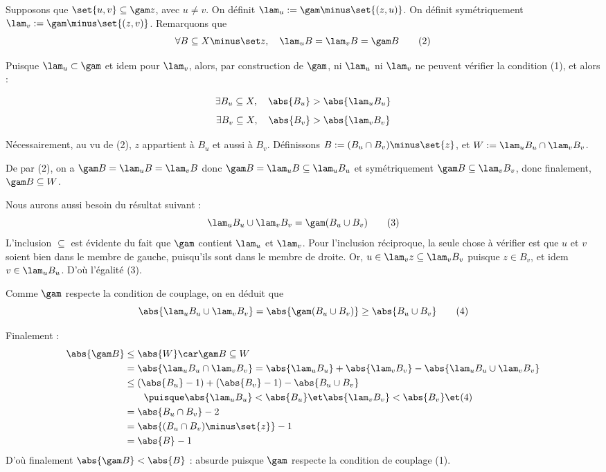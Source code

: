     Supposons que $\set{u,v} \subseteq \gam z$, avec $u \neq v$. On définit $\lam_u := \gam \minus \set{(z,u)}$. On définit symétriquement $\lam_v := \gam \minus \set{(z,v)}$. Remarquons que
    \[ \forall B \subseteq X \minus \set z, \quad \lam_u B = \lam_v B = \gam B \tag{2} \]
    
    Puisque $\lam_u \subset \gam$ et idem pour $\lam_v$, alors, par construction de $\gam$, ni $\lam_u$ ni $\lam_v$ ne peuvent vérifier la condition (1), et alors :
    
    \[ \exists B_u \subseteq X, \quad \abs{B_u} > \abs{\lam_u B_u} \]
    \[ \exists B_v \subseteq X, \quad \abs{B_v} > \abs{\lam_v B_v} \]
    
    Nécessairement, au vu de (2), $z$ appartient à $B_u$ et aussi à $B_v$. Définissons $B := (B_u \cap B_v) \minus \set{z}$, et $W := \lam_u B_u \cap \lam_v B_v$.
    
    De par (2), on a $\gam B = \lam_u B = \lam_v B$ donc $\gam B = \lam_u B \subseteq \lam_u B_u$ et symétriquement $\gam B \subseteq \lam_v B_v$, donc finalement, $\gam B \subseteq W$.
    
    Nous aurons aussi besoin du résultat suivant :
    \[ \lam_u B_u \cup \lam_v B_v = \gam (B_u \cup B_v)  \tag{3} \]
    L'inclusion $\subseteq$ est évidente du fait que $\gam$ contient $\lam_u$ et $\lam_v$. Pour l'inclusion réciproque, la seule chose à vérifier est que $u$ et $v$ soient bien dans le membre de gauche, puisqu'ils sont dans le membre de droite. Or, $u \in \lam_v z \subseteq \lam_v B_v $ puisque $z \in B_v$, et idem $v \in \lam_u B_u$. D'où l'égalité (3).
    
    Comme $\gam$ respecte la condition de couplage, on en déduit que
    \[ \abs{\lam_u B_u \cup \lam_v B_v} = \abs{\gam (B_u \cup B_v) } \geq \abs{B_u \cup B_v} \tag{4} \]
    
    Finalement :
    \[ \begin{aligned}
        \abs{\gam B} &\leq \abs{W}  \car \gam B \subseteq W \\
        & = \abs{ \lam_u B_u \cap \lam_v B_v } = \abs {\lam_u B_u} + \abs{\lam_v B_v} - \abs{\lam_u B_u \cup \lam_v B_v}\\
        & \leq (\abs {B_u} - 1)  + (\abs{B_v} - 1) - \abs{B_u \cup B_v} \\
        &    \qquad  \puisque \abs{\lam_u B_u} < \abs{B_u} \et \abs{\lam_v B_v} < \abs{B_v} \et \text{(4)} \\
        & =    \abs {B_u \cap B_v} - 2 \\
        & =    \abs {(B_u \cap B_v) \minus \set{z}} - 1 \\
        & =    \abs{B} - 1
    \end{aligned} \]
    D'où finalement $\abs{\gam B} < \abs{B}$ : absurde puisque $\gam$ respecte la condition de couplage (1).
    
